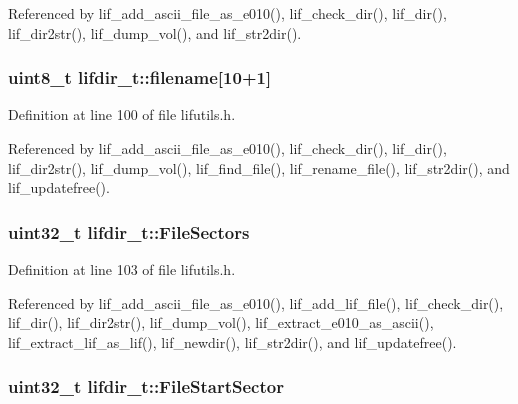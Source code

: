 Referenced by lif\+\_\+add\+\_\+ascii\+\_\+file\+\_\+as\+\_\+e010(), lif\+\_\+check\+\_\+dir(), lif\+\_\+dir(), lif\+\_\+dir2str(), lif\+\_\+dump\+\_\+vol(), and lif\+\_\+str2dir().

\subsubsection[{\texorpdfstring{filename}{filename}}]{\setlength{\rightskip}{0pt plus 5cm}uint8\+\_\+t lifdir\+\_\+t\+::filename\mbox{[}10+1\mbox{]}}\hypertarget{structlifdir__t_a700fd2eb77539353ba670b76d9acb29d}{}\label{structlifdir__t_a700fd2eb77539353ba670b76d9acb29d}


Definition at line 100 of file lifutils.\+h.



Referenced by lif\+\_\+add\+\_\+ascii\+\_\+file\+\_\+as\+\_\+e010(), lif\+\_\+check\+\_\+dir(), lif\+\_\+dir(), lif\+\_\+dir2str(), lif\+\_\+dump\+\_\+vol(), lif\+\_\+find\+\_\+file(), lif\+\_\+rename\+\_\+file(), lif\+\_\+str2dir(), and lif\+\_\+updatefree().

\subsubsection[{\texorpdfstring{File\+Sectors}{FileSectors}}]{\setlength{\rightskip}{0pt plus 5cm}uint32\+\_\+t lifdir\+\_\+t\+::\+File\+Sectors}\hypertarget{structlifdir__t_a92382e062294ebdc632c6c78dcd397aa}{}\label{structlifdir__t_a92382e062294ebdc632c6c78dcd397aa}


Definition at line 103 of file lifutils.\+h.



Referenced by lif\+\_\+add\+\_\+ascii\+\_\+file\+\_\+as\+\_\+e010(), lif\+\_\+add\+\_\+lif\+\_\+file(), lif\+\_\+check\+\_\+dir(), lif\+\_\+dir(), lif\+\_\+dir2str(), lif\+\_\+dump\+\_\+vol(), lif\+\_\+extract\+\_\+e010\+\_\+as\+\_\+ascii(), lif\+\_\+extract\+\_\+lif\+\_\+as\+\_\+lif(), lif\+\_\+newdir(), lif\+\_\+str2dir(), and lif\+\_\+updatefree().

\subsubsection[{\texorpdfstring{File\+Start\+Sector}{FileStartSector}}]{\setlength{\rightskip}{0pt plus 5cm}uint32\+\_\+t lifdir\+\_\+t\+::\+File\+Start\+Sector}\hypertarget{structlifdir__t_ac17bb6f653b05078f5fc8112c21286f2}{}\label{structlifdir__t_ac17bb6f653b05078f5fc8112c21286f2}


